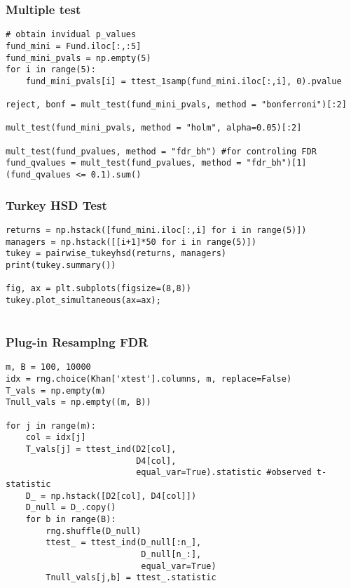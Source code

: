 \documentclass[
  letterpaper,
  DIV=11,
  numbers=noendperiod]{scrreprt}
\begin{document}
{{\begin{verbatim}
\end{verbatim}

\subsubsection{Multiple test}\label{multiple-test}

\begin{verbatim}
# obtain invidual p_values
fund_mini = Fund.iloc[:,:5]
fund_mini_pvals = np.empty(5)
for i in range(5):
    fund_mini_pvals[i] = ttest_1samp(fund_mini.iloc[:,i], 0).pvalue

reject, bonf = mult_test(fund_mini_pvals, method = "bonferroni")[:2]   

mult_test(fund_mini_pvals, method = "holm", alpha=0.05)[:2]

mult_test(fund_pvalues, method = "fdr_bh") #for controling FDR
fund_qvalues = mult_test(fund_pvalues, method = "fdr_bh")[1]
(fund_qvalues <= 0.1).sum()
\end{verbatim}

\subsubsection{Turkey HSD Test}\label{turkey-hsd-test}

\begin{verbatim}
returns = np.hstack([fund_mini.iloc[:,i] for i in range(5)])
managers = np.hstack([[i+1]*50 for i in range(5)])
tukey = pairwise_tukeyhsd(returns, managers)
print(tukey.summary())

fig, ax = plt.subplots(figsize=(8,8))
tukey.plot_simultaneous(ax=ax);


\end{verbatim}

\subsubsection{Plug-in Resamplng FDR}\label{plug-in-resamplng-fdr}

\begin{verbatim}
m, B = 100, 10000
idx = rng.choice(Khan['xtest'].columns, m, replace=False)
T_vals = np.empty(m)
Tnull_vals = np.empty((m, B))

for j in range(m):
    col = idx[j]
    T_vals[j] = ttest_ind(D2[col],
                          D4[col],
                          equal_var=True).statistic #observed t-statistic
    D_ = np.hstack([D2[col], D4[col]])
    D_null = D_.copy()
    for b in range(B):
        rng.shuffle(D_null)
        ttest_ = ttest_ind(D_null[:n_],
                           D_null[n_:],
                           equal_var=True)
        Tnull_vals[j,b] = ttest_.statistic
        

\end{verbatim}}}
\end{document}
